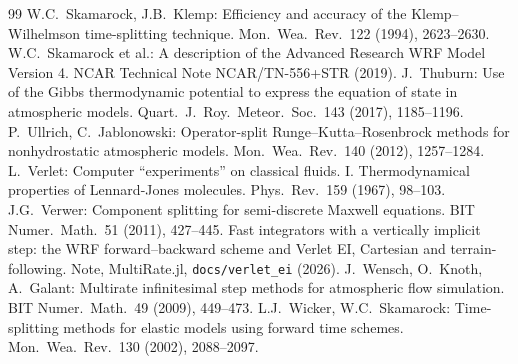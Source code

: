 \documentclass[11pt,a4paper]{article}
\newcommand{\code}[1]{\texttt{\small #1}}
\begin{document}
\begin{thebibliography}{99}
 W.C.~Skamarock, J.B.~Klemp: Efficiency and accuracy of the Klemp--Wilhelmson
time-splitting technique. Mon.\ Wea.\ Rev.\ 122 (1994), 2623--2630.
 W.C.~Skamarock et al.: A description of the Advanced Research WRF Model Version 4.
NCAR Technical Note NCAR/TN-556+STR (2019).
 J.~Thuburn: Use of the Gibbs thermodynamic potential to express the equation of state in
atmospheric models. Quart.\ J.\ Roy.\ Meteor.\ Soc.\ 143 (2017), 1185--1196.
 P.~Ullrich, C.~Jablonowski: Operator-split Runge--Kutta--Rosenbrock methods for
nonhydrostatic atmospheric models. Mon.\ Wea.\ Rev.\ 140 (2012), 1257--1284.
 L.~Verlet: Computer ``experiments'' on classical fluids. I. Thermodynamical properties of
Lennard-Jones molecules. Phys.\ Rev.\ 159 (1967), 98--103.
 J.G.~Verwer: Component splitting for semi-discrete Maxwell equations. BIT Numer.\ Math.\
51 (2011), 427--445.
 Fast integrators with a vertically implicit step: the WRF forward--backward scheme and
Verlet EI, Cartesian and terrain-following. Note, MultiRate.jl, \code{docs/verlet\_ei} (2026).
\bibitem{wkg} J.~Wensch, O.~Knoth, A.~Galant: Multirate infinitesimal step methods for atmospheric flow
simulation. BIT Numer.\ Math.\ 49 (2009), 449--473.
 L.J.~Wicker, W.C.~Skamarock: Time-splitting methods for elastic models using forward time
schemes. Mon.\ Wea.\ Rev.\ 130 (2002), 2088--2097.
\end{thebibliography}
\end{document}
